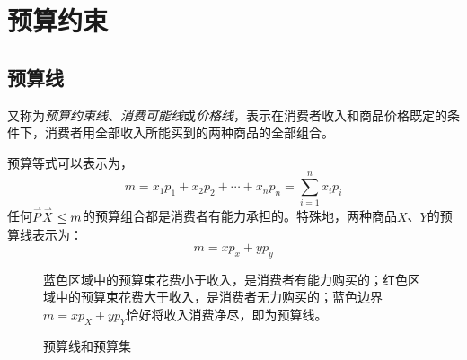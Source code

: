 \chapter{预算约束}
\label{sec:budget-constraint}

\section{预算线}

\begin{Definition}[预算线]
又称为\emph{预算约束线}、\emph{消费可能线}或\emph{价格线}，表示在消费者收入和商品价格既定的条件下，消费者用全部收入所能买到的两种商品的全部组合。
\end{Definition}

预算等式可以表示为，
\[
m = {x_1}{p_1} + {x_2}{p_2} +  \cdots  + {x_n}{p_n} = \sum\limits_{i = 1}^n {{x_i}{p_i}}
\]
任何$\mathord{\buildrel{\lower3pt\hbox{$\scriptscriptstyle\rightharpoonup$}} 
\over P} \mathord{\buildrel{\lower3pt\hbox{$\scriptscriptstyle\rightharpoonup$}} 
\over X}  \le m$的预算组合都是消费者有能力承担的。特殊地，两种商品$X$、$Y$的预算线表示为：
\begin{equation}\label{equ:budget-constraint-two-goods}
m = x p_x + y p_y
\end{equation}

\begin{figure}[!h]
\begin{shaded*}
  \begin{minipage}[t]{0.5\linewidth} 
    \centering 
	    \vspace{0pt}
  \end{minipage}%
  \begin{minipage}[t]{0.5\linewidth} 
	    \vspace{55pt}
\caption{预算线和预算集}
\label{fig:budget-constraint}
{\kaishu\small  蓝色区域中的预算束花费小于收入，是消费者有能力购买的；红色区域中的预算束花费大于收入，是消费者无力购买的；蓝色边界$m = xp_X + yp_Y$恰好将收入消费净尽，即为预算线。}
  \end{minipage} 
\end{shaded*}
\end{figure}

